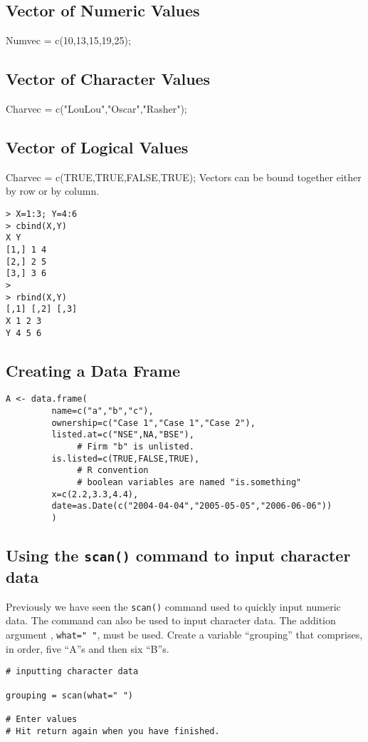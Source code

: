 \subsection*{ Vector of Numeric Values}
Numvec = c(10,13,15,19,25);

\subsection*{ Vector of Character Values}
Charvec = c("LouLou","Oscar","Rasher");


\subsection*{Vector of Logical Values}
Charvec = c(TRUE,TRUE,FALSE,TRUE);
Vectors can be bound together either by row or by column.
\begin{verbatim}
> X=1:3; Y=4:6
> cbind(X,Y)
X Y
[1,] 1 4
[2,] 2 5
[3,] 3 6
>
> rbind(X,Y)
[,1] [,2] [,3]
X 1 2 3
Y 4 5 6
\end{verbatim}



\subsection*{Creating a Data Frame}
\begin{framed}
\begin{verbatim}
A <- data.frame(
         name=c("a","b","c"),
         ownership=c("Case 1","Case 1","Case 2"),
         listed.at=c("NSE",NA,"BSE"),
              # Firm "b" is unlisted.
         is.listed=c(TRUE,FALSE,TRUE),
              # R convention
              # boolean variables are named "is.something"
         x=c(2.2,3.3,4.4),
         date=as.Date(c("2004-04-04","2005-05-05","2006-06-06"))
         )
\end{verbatim}
\end{framed}

\subsection*{Using the \texttt{scan()} command to input character data}
Previously we have seen the \texttt{scan()} command used to quickly input numeric data. The command can also be used to input character data. The addition argument , \texttt{what=" "}, must be used.  
Create a variable “grouping” that comprises, in order,  five “A”s and then six “B”s.

\begin{verbatim}
# inputting character data

grouping = scan(what=" ")

# Enter values
# Hit return again when you have finished.

\end{verbatim}
